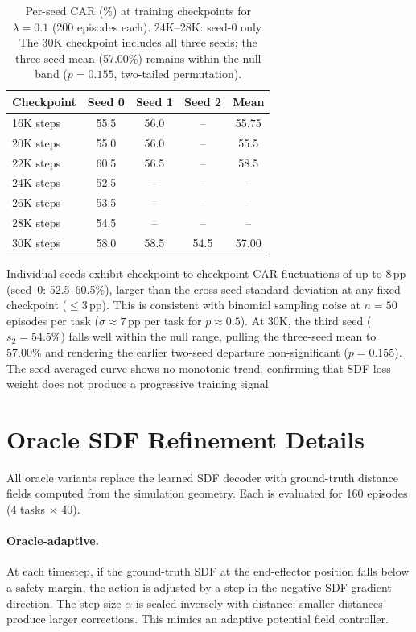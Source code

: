 \begin{table}[h]
\centering
\caption{Per-seed CAR (\%) at training checkpoints for $\lambda = 0.1$ (200 episodes each). 24K--28K: seed-0 only. The 30K checkpoint includes all three seeds; the three-seed mean (57.00\%) remains within the null band ($p = 0.155$, two-tailed permutation).}
\label{tab:stepwise_lambda01}
\vspace{2pt}
\small
\begin{tabular}{lcccc}
\toprule
Checkpoint & Seed 0 & Seed 1 & Seed 2 & Mean \\
\midrule
16K steps & 55.5 & 56.0 & -- & 55.75 \\
20K steps & 55.0 & 56.0 & -- & 55.5 \\
22K steps & 60.5 & 56.5 & -- & 58.5 \\
24K steps & 52.5 & -- & -- & -- \\
26K steps & 53.5 & -- & -- & -- \\
28K steps & 54.5 & -- & -- & -- \\
30K steps & 58.0 & 58.5 & 54.5 & 57.00 \\
\bottomrule
\end{tabular}
\end{table}

Individual seeds exhibit checkpoint-to-checkpoint CAR fluctuations of up to 8\,pp (seed~0: 52.5--60.5\%), larger than the cross-seed standard deviation at any fixed checkpoint ($\leq$3\,pp). This is consistent with binomial sampling noise at $n = 50$ episodes per task ($\sigma \approx 7$\,pp per task for $p \approx 0.5$). At 30K, the third seed ($s_2 = 54.5\%$) falls well within the null range, pulling the three-seed mean to 57.00\% and rendering the earlier two-seed departure non-significant ($p = 0.155$). The seed-averaged curve shows no monotonic trend, confirming that SDF loss weight does not produce a progressive training signal.


\section{Oracle SDF Refinement Details}
\label{sec:appendix_oracle}

All oracle variants replace the learned SDF decoder with ground-truth distance fields computed from the simulation geometry. Each is evaluated for 160 episodes (4 tasks $\times$ 40).

\paragraph{Oracle-adaptive.} At each timestep, if the ground-truth SDF at the end-effector position falls below a safety margin, the action is adjusted by a step in the negative SDF gradient direction. The step size $\alpha$ is scaled inversely with distance: smaller distances produce larger corrections. This mimics an adaptive potential field controller.

